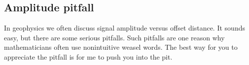 
\subsection{Amplitude pitfall}
In geophysics we often discuss signal amplitude versus offset distance.
It sounds easy, but there are some serious pitfalls.
Such pitfalls are one reason why mathematicians
often use nonintuitive weasel words.
The best way for you to appreciate the pitfall
is for me to push you into the pit.

